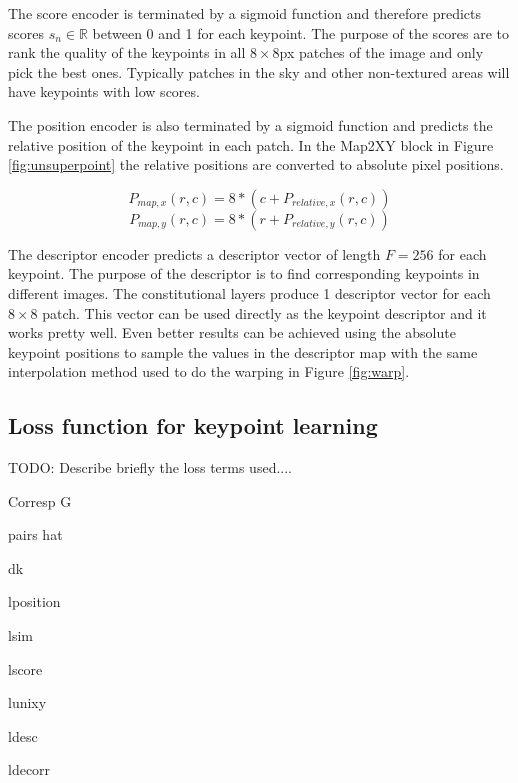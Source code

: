 The score encoder is terminated by a sigmoid function and therefore predicts scores $s_n \in \mathbb{R} $ between 0 and 1 for each keypoint. The purpose of the scores are to rank the quality of the keypoints in all $8\times 8$px patches of the image and only pick the best ones. Typically patches in the sky and other non-textured areas will have keypoints with low scores.

The position encoder is also terminated by a sigmoid function and predicts the relative position of the keypoint in each patch. In the Map2XY block in Figure \ref{fig:unsuperpoint} the relative positions are converted to absolute pixel positions.

\[
P_{map,x}(r,c) = 8 * (c + P_{relative,x}(r,c))
\]
\[
P_{map,y}(r,c) = 8 * (r + P_{relative,y}(r,c))
\]

The descriptor encoder predicts a descriptor vector of length $F=256$ for each keypoint. The purpose of the descriptor is to find corresponding keypoints in different images. The constitutional layers produce 1 descriptor vector for each $8\times 8$ patch. This vector can be used directly as the keypoint descriptor and it works pretty well. Even better results can be achieved using the absolute keypoint positions to sample the values in the descriptor map with the same interpolation method used to do the warping in Figure \ref{fig:warp}.


\subsection{Loss function for keypoint learning}

TODO: Describe briefly the loss terms used....

Corresp G

pairs hat

dk

lposition

lsim

lscore

lunixy

ldesc

ldecorr

